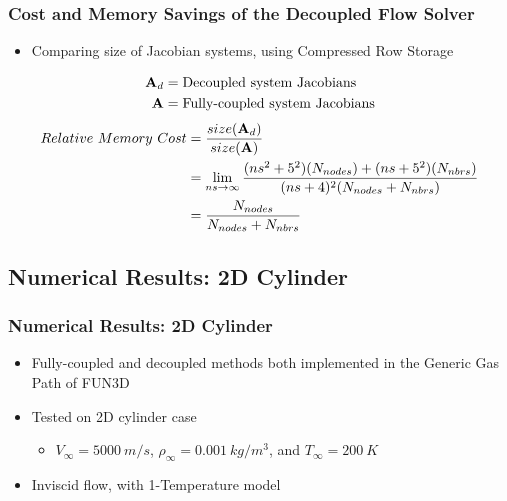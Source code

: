 \documentclass{beamer}
\begin{document}
\begin{frame}
  \frametitle{Cost and Memory Savings of the Decoupled Flow Solver}
  \begin{itemize}
    \item Comparing size of Jacobian systems, using Compressed Row Storage
  \end{itemize}
  \begin{align*}
    \mathbf A_d &= \text{Decoupled system Jacobians} \\
    \mathbf A &= \text{Fully-coupled system Jacobians}
  \end{align*}
  \[
  \begin{split} Relative\ Memory\ Cost &=
    \frac{size(\mathbf A_d)}{size(\mathbf A)} \\ &= \lim_{ns\to\infty}
    \frac{(ns^2+5^2)(N_{nodes})+(ns+5^2)(N_{nbrs})}{(ns+4)^2(N_{nodes}+N_{nbrs})} \\
    &= \frac{N_{nodes}}{N_{nodes} + N_{nbrs}}
  \end{split}
  \]
\end{frame}

\subsection{Numerical Results: 2D Cylinder}

\begin{frame}
  \frametitle{Numerical Results: 2D Cylinder}
  \begin{figure}[h]
  	\centering
  \end{figure}
  \begin{itemize}
    \item Fully-coupled and decoupled methods both implemented in the Generic
      Gas Path of FUN3D
    \item Tested on 2D cylinder case
      \begin{itemize}
        \item $V_{\infty} = 5000\ m/s$, $\rho_{\infty}=0.001\ kg/m^3$, 
          and $T_\infty = 200\ K$
      \end{itemize}
    \item Inviscid flow, with 1-Temperature model
  \end{itemize}
\end{frame}
\end{document}
